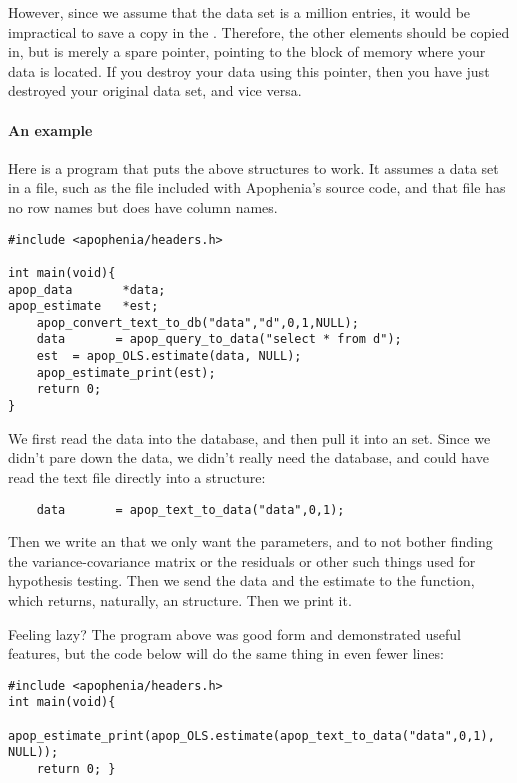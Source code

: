 However, since we assume that the data set is a million entries, it
would be impractical to save a copy in the .
Therefore, the other elements should be copied in, but
 is merely a spare
pointer, pointing to the block of memory where your data is located. If
you destroy your data using this pointer, then you have just destroyed
your original data set, and vice versa.


\paragraph{An example}
Here is a program that puts the above structures to work.  It assumes a
data set in a file, such as the  file included with
Apophenia's source code, and that file has no row names but does have
column names.
\begin{lstlisting}
#include <apophenia/headers.h>

int main(void){
apop_data       *data;
apop_estimate   *est;
    apop_convert_text_to_db("data","d",0,1,NULL);
    data       = apop_query_to_data("select * from d");
    est  = apop_OLS.estimate(data, NULL);
    apop_estimate_print(est);
    return 0;
}
\end{lstlisting}

We first read the data into the database, and then pull it into an  set. Since we didn't pare down the data, we didn't really
need the database, and could have read the text file directly into a
 structure:
\begin{lstlisting}
    data       = apop_text_to_data("data",0,1);
\end{lstlisting}
Then we write an  that we only want the
parameters, and to not bother finding the variance-covariance matrix or
the residuals or other such things used for hypothesis testing. Then we
send the data and the estimate to the 
function, which returns, naturally, an 
structure. Then we print it.

Feeling lazy? The program above was good form and demonstrated useful
features, but the code below will do the same thing in even fewer lines:

\label{oneliner}
\begin{lstlisting}
#include <apophenia/headers.h>
int main(void){
    apop_estimate_print(apop_OLS.estimate(apop_text_to_data("data",0,1), NULL));
    return 0; }
\end{lstlisting}

